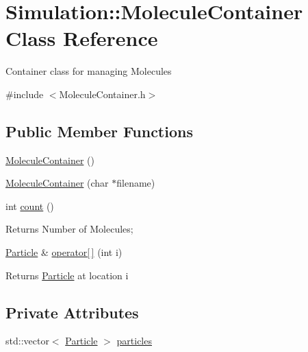 \hypertarget{classSimulation_1_1MoleculeContainer}{\section{Simulation\-:\-:Molecule\-Container Class Reference}
\label{classSimulation_1_1MoleculeContainer}
}


Container class for managing Molecules  




{\ttfamily \#include $<$Molecule\-Container.\-h$>$}

\subsection*{Public Member Functions}
\begin{DoxyCompactItemize}
\item 
\hyperlink{classSimulation_1_1MoleculeContainer_a360a7ddab91b51cb23f69446f15ca25a}{Molecule\-Container} ()
\item 
\hyperlink{classSimulation_1_1MoleculeContainer_a0c72d6294527e99d079699e89782c475}{Molecule\-Container} (char $\ast$filename)
\item 
int \hyperlink{classSimulation_1_1MoleculeContainer_adf939bdcfc7fe2ec04d91846785a49a6}{count} ()
\begin{DoxyCompactList}\small\item\em \begin{DoxyReturn}{Returns}
Number of Molecules; 
\end{DoxyReturn}
\end{DoxyCompactList}\item 
\hyperlink{classSimulation_1_1Particle}{Particle} \& \hyperlink{classSimulation_1_1MoleculeContainer_a59d68ea3d499b9d9b96a5a0c9c3b04a6}{operator\mbox{[}$\,$\mbox{]}} (int i)
\begin{DoxyCompactList}\small\item\em \begin{DoxyReturn}{Returns}
\hyperlink{classSimulation_1_1Particle}{Particle} at location i 
\end{DoxyReturn}
\end{DoxyCompactList}\end{DoxyCompactItemize}
\subsection*{Private Attributes}
\begin{DoxyCompactItemize}
\item 
std\-::vector$<$ \hyperlink{classSimulation_1_1Particle}{Particle} $>$ \hyperlink{classSimulation_1_1MoleculeContainer_a030dda8865bc9fed733c1b01e435e3a5}{particles}
\end{DoxyCompactItemize}


